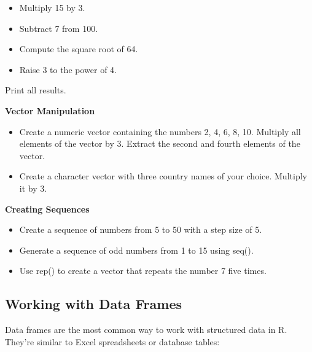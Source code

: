 \documentclass[
]{book}
\providecommand{\tightlist}{%
  \setlength{\itemsep}{0pt}\setlength{\parskip}{0pt}}
\begin{document}
\begin{itemize}
\tightlist
\item
  Multiply 15 by 3.
\item
  Subtract 7 from 100.
\item
  Compute the square root of 64.
\item
  Raise 3 to the power of 4.
\end{itemize}

Print all results.

\textbf{Vector Manipulation}

\begin{itemize}
\item
  Create a numeric vector containing the numbers 2, 4, 6, 8, 10. Multiply all elements of the vector by 3. Extract the second and fourth elements of the vector.
\item
  Create a character vector with three country names of your choice. Multiply it by 3.
\end{itemize}

\textbf{Creating Sequences}

\begin{itemize}
\tightlist
\item
  Create a sequence of numbers from 5 to 50 with a step size of 5.
\item
  Generate a sequence of odd numbers from 1 to 15 using seq().
\item
  Use rep() to create a vector that repeats the number 7 five times.
\end{itemize}

\subsection{Working with Data Frames}\label{working-with-data-frames}

Data frames are the most common way to work with structured data in R. They're similar to Excel spreadsheets or database tables:
\end{document}
